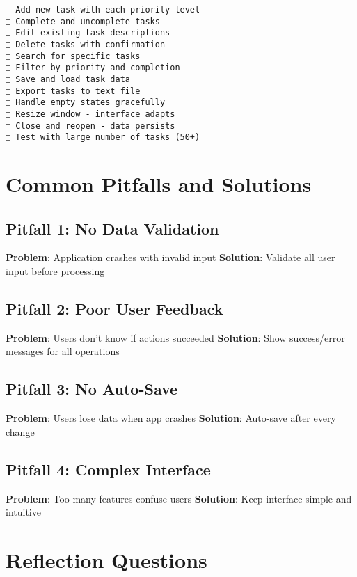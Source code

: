 \documentclass[
  letterpaper,
  DIV=11,
  numbers=noendperiod,
  oneside]{scrreprt}
\begin{document}
\begin{verbatim}
□ Add new task with each priority level
□ Complete and uncomplete tasks
□ Edit existing task descriptions
□ Delete tasks with confirmation
□ Search for specific tasks
□ Filter by priority and completion
□ Save and load task data
□ Export tasks to text file
□ Handle empty states gracefully
□ Resize window - interface adapts
□ Close and reopen - data persists
□ Test with large number of tasks (50+)
\end{verbatim}

\section{Common Pitfalls and
Solutions}\label{common-pitfalls-and-solutions-5}

\subsection{Pitfall 1: No Data
Validation}\label{pitfall-1-no-data-validation}

\textbf{Problem}: Application crashes with invalid input
\textbf{Solution}: Validate all user input before processing

\subsection{Pitfall 2: Poor User
Feedback}\label{pitfall-2-poor-user-feedback}

\textbf{Problem}: Users don't know if actions succeeded
\textbf{Solution}: Show success/error messages for all operations

\subsection{Pitfall 3: No Auto-Save}\label{pitfall-3-no-auto-save}

\textbf{Problem}: Users lose data when app crashes \textbf{Solution}:
Auto-save after every change

\subsection{Pitfall 4: Complex
Interface}\label{pitfall-4-complex-interface}

\textbf{Problem}: Too many features confuse users \textbf{Solution}:
Keep interface simple and intuitive

\section{Reflection Questions}\label{reflection-questions-11}
\end{document}
